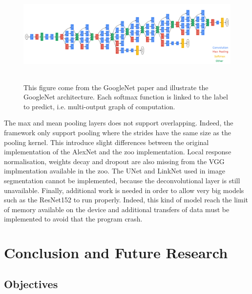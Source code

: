 \documentclass[11pt]{report}
\begin{document}
\begin{figure}[h]
\centering
\includegraphics[width=16cm, height=5cm]{googlenet}
\caption[GoogleNet architecture]{This figure come from the GoogleNet paper \cite{DBLP:conf/cvpr/SzegedyLJSRAEVR15} and illustrate the GoogleNet architecture. Each softmax function is linked to the label to predict, i.e. multi-output graph of computation.}
\label{fig:googlenet}
\end{figure}
\noindent The max and mean pooling layers does not support overlapping. Indeed, the framework only support pooling where the strides have the same size as the pooling kernel. This introduce slight differences between the original implementation of the AlexNet and the zoo implementation.
\newline
\newline
\noindent Local response normalisation, weights decay and dropout are also missing from the VGG implmentation available in the zoo. The UNet and LinkNet used in image segmentation cannot be implemented, because the deconvolutional layer is still unavailable.
\newline
\newline
\noindent Finally, additional work is needed in order to allow very big models such as the ResNet152 to run properly. Indeed, this kind of model reach the limit of memory available on the device and additional transfers of data must be implemented to avoid that the program crash.

\chapter{Conclusion and Future Research} \label{conclusion}

\section{Objectives}
\end{document}
